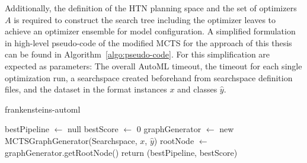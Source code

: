 Additionally, the definition of the HTN planning space and the set of optimizers $A$ is required to construct the search tree including the optimizer leaves to achieve an optimizer ensemble for model configuration.
A simplified formulation in high-level pseudo-code of the modified MCTS for the approach of this thesis can be found in Algorithm~\ref{algo:pseudo-code}.
For this simplification are expected as parameters: The overall AutoML timeout, the timeout for each single optimization run, a searchspace created beforehand from searchspace definition files, and the dataset in the format instances $x$ and classes $\hat{y}$.
\begin{algorithm}[ht!]
    \caption{frankensteins-automl}
    \label{algo:pseudo-code}
    \SetAlgoLined
    \DontPrintSemicolon
    \BlankLine
    bestPipeline $\leftarrow$ null\;
    bestScore $\leftarrow$ 0\;
    graphGenerator $\leftarrow$ new MCTSGraphGenerator(Searchspace, $x$, $\hat{y}$)\;
    rootNode $\leftarrow$ graphGenerator.getRootNode()\;
    return (bestPipeline, bestScore)\;
\end{algorithm}

